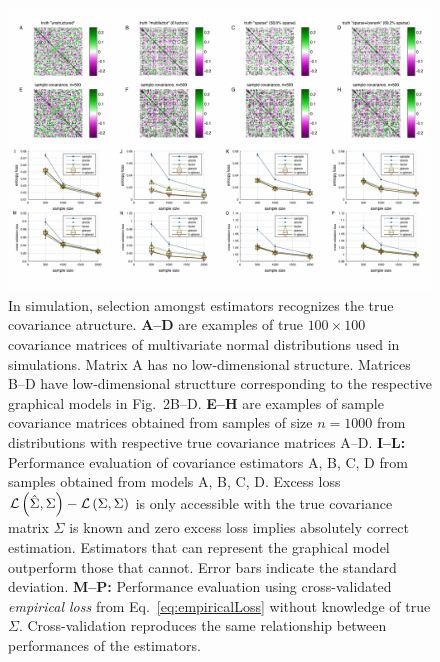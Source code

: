 \begin{figure}[htp]
\centering
\includegraphics[width=1.0\textwidth]{figures/Figure3.pdf}
\caption{
In simulation, selection amongst estimators recognizes the true covariance atructure. 
{\bf A--D} are examples of true $100\times100$ covariance matrices of multivariate normal distributions used in simulations. Matrix A has no low-dimensional structure. Matrices B--D have low-dimensional structture corresponding to the respective graphical models in Fig.~2B--D.
{\bf E--H} are examples of sample covariance matrices obtained from samples of size $n=1000$ from distributions with respective true covariance matrices A--D.
{\bf I--L:} Performance evaluation of covariance estimators A, B, C, D from samples obtained from models A, B, C, D.  Excess loss $\mathcal L\left(\hat\Sigma,\Sigma\right)-\mathcal L\left(\Sigma,\Sigma\right)$ is only accessible with the true covariance matrix $\Sigma$ is known and zero excess loss implies absolutely correct estimation. Estimators that can represent the graphical model outperform those that cannot.  Error bars indicate the standard deviation. 
{\bf M--P:} Performance evaluation using cross-validated \emph{empirical loss} from Eq.~\ref{eq:empiricalLoss} without knowledge of true $\Sigma$. Cross-validation reproduces the same relationship between performances of the estimators.
}\label{fig:03}
\end{figure}